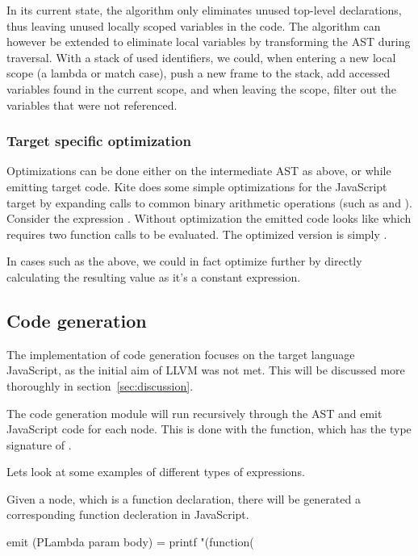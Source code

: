 In its current state, the algorithm only eliminates unused top-level declarations, thus leaving unused locally scoped variables in the code. The algorithm can however be extended to eliminate local variables by transforming the AST during traversal. With a stack of used identifiers, we could, when entering a new local scope (a lambda or match case), push a new frame to the stack, add accessed variables found in the current scope, and when leaving the scope, filter out the variables that were not referenced.

\subsubsection{Target specific optimization}
Optimizations can be done either on the intermediate AST as above, or while emitting target code. Kite does some simple optimizations for the JavaScript target by expanding calls to common binary arithmetic operations (such as \code{+} and \code{*}). Consider the expression . Without optimization the emitted code looks like  which  requires two function calls to be evaluated. The optimized version is simply .

In cases such as the above, we could in fact optimize further by directly calculating the resulting value as it's a constant expression.


\subsection{Code generation}
The implementation of code generation focuses on the target language JavaScript, as the initial aim of LLVM was not met. This will be discussed more thoroughly in section~\ref{sec:discussion}.

The code generation module will run recursively through the AST and emit JavaScript code for each node. This is done with the  function, which has the type signature of .

Lets look at some examples of different types of expressions.

Given a  node, which is a function declaration, there will be generated a corresponding function decleration in JavaScript.

\begin{haskell}
emit (PLambda param body) = printf "(function(%
\end{haskell}

